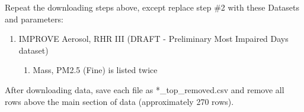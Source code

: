 Repeat the downloading steps above, except replace step \#2 with these Datasets and parameters:
\begin{enumerate}
\item IMPROVE Aerosol, RHR III (DRAFT - Preliminary Most Impaired Days dataset) 
	\begin{enumerate}
	\item Mass, PM2.5 (Fine) is listed twice %
	\end{enumerate}
\end{enumerate}

After downloading data, save each file as *\_top\_removed.csv and remove all rows above the main section of data (approximately 270 rows). 








